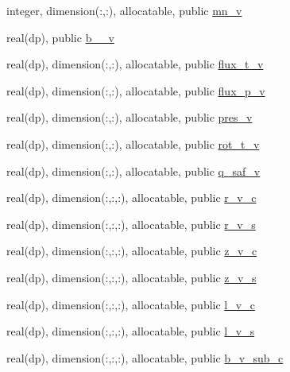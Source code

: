 \begin{DoxyCompactItemize}
\item 
integer, dimension(\+:,\+:), allocatable, public \hyperlink{namespacevmec__vars_a4b9a64bc60d45f2b10e03f624ade3e82}{mn\+\_\+v}
\item 
real(dp), public \hyperlink{namespacevmec__vars_a71e1a738f0e423fe6c284f8ea636008e}{b\+\_\+\_\+v}
\item 
real(dp), dimension(\+:,\+:), allocatable, public \hyperlink{namespacevmec__vars_ac246a5937702b1ac4c7f9bd92d286766}{flux\+\_\+t\+\_\+v}
\item 
real(dp), dimension(\+:,\+:), allocatable, public \hyperlink{namespacevmec__vars_aeac5e1262f419b7ae674586f576dc928}{flux\+\_\+p\+\_\+v}
\item 
real(dp), dimension(\+:,\+:), allocatable, public \hyperlink{namespacevmec__vars_a958baf9fece8a4a001b6d8d767b48179}{pres\+\_\+v}
\item 
real(dp), dimension(\+:,\+:), allocatable, public \hyperlink{namespacevmec__vars_a676475bc7e07d96fc91c2773c8d2c84a}{rot\+\_\+t\+\_\+v}
\item 
real(dp), dimension(\+:,\+:), allocatable, public \hyperlink{namespacevmec__vars_a08f3862b0bb940623a416a056f03b092}{q\+\_\+saf\+\_\+v}
\item 
real(dp), dimension(\+:,\+:,\+:), allocatable, public \hyperlink{namespacevmec__vars_a8307a4a411dadf5b9be24f8aafac5f39}{r\+\_\+v\+\_\+c}
\item 
real(dp), dimension(\+:,\+:,\+:), allocatable, public \hyperlink{namespacevmec__vars_ac6cdafd632e37856533c42e8ab34a680}{r\+\_\+v\+\_\+s}
\item 
real(dp), dimension(\+:,\+:,\+:), allocatable, public \hyperlink{namespacevmec__vars_a66130a0eb0bc39ae0294f008f283efcd}{z\+\_\+v\+\_\+c}
\item 
real(dp), dimension(\+:,\+:,\+:), allocatable, public \hyperlink{namespacevmec__vars_ac6a5f1ccefd4c0337189c09166558bb1}{z\+\_\+v\+\_\+s}
\item 
real(dp), dimension(\+:,\+:,\+:), allocatable, public \hyperlink{namespacevmec__vars_acf90dcedfaae39a8a6778fbf75a90a40}{l\+\_\+v\+\_\+c}
\item 
real(dp), dimension(\+:,\+:,\+:), allocatable, public \hyperlink{namespacevmec__vars_a5d1de7879021fa8c1d8c10bbef01f9c7}{l\+\_\+v\+\_\+s}
\item 
real(dp), dimension(\+:,\+:,\+:), allocatable, public \hyperlink{namespacevmec__vars_a2e07a2b5bd2384e16e8af8ca4f5b50d6}{b\+\_\+v\+\_\+sub\+\_\+c}
\item 

\end{DoxyCompactItemize}
